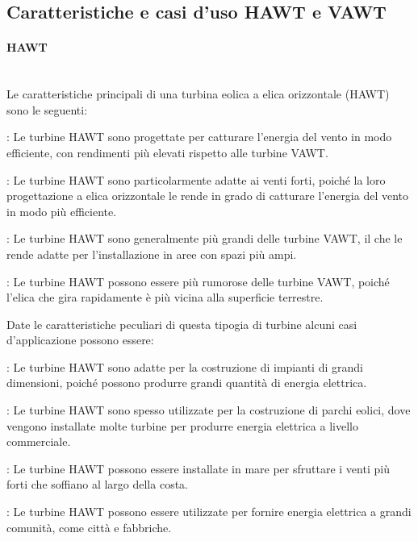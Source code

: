 \subsection{Caratteristiche e casi d'uso HAWT e VAWT}
\paragraph{HAWT}\mbox{}\\
Le caratteristiche principali di una turbina eolica a elica orizzontale (HAWT) sono le seguenti:
\begin{description}[labelindent=5mm]
    \item[$\bullet$ Alta efficienza]: Le turbine HAWT sono progettate per catturare l'energia del vento in modo efficiente, con rendimenti più elevati rispetto alle turbine VAWT.
    \item[$\bullet$ Adatte ai venti forti]: Le turbine HAWT sono particolarmente adatte ai venti forti, poiché la loro progettazione a elica orizzontale le rende in grado di catturare l'energia del vento in modo più efficiente.
    \item[$\bullet$ Dimensioni maggiori]: Le turbine HAWT sono generalmente più grandi delle turbine VAWT, il che le rende adatte per l'installazione in aree con spazi più ampi.
    \item[$\bullet$ Funzionamento più rumoroso]: Le turbine HAWT possono essere più rumorose delle turbine VAWT, poiché l'elica che gira rapidamente è più vicina alla superficie terrestre.
\end{description}
Date le caratteristiche peculiari di questa tipogia di turbine alcuni casi d'applicazione possono essere:
\begin{description}[labelindent=5mm]
    \item[$\bullet$ Impianti di grandi dimensioni]: Le turbine HAWT sono adatte per la costruzione di impianti di grandi dimensioni, poiché possono produrre grandi quantità di energia elettrica.
    \item[$\bullet$ Parchi eolici]: Le turbine HAWT sono spesso utilizzate per la costruzione di parchi eolici, dove vengono installate molte turbine per produrre energia elettrica a livello commerciale.
    \item[$\bullet$ Installazioni offshore]: Le turbine HAWT possono essere installate in mare per sfruttare i venti più forti che soffiano al largo della costa.
    \item[$\bullet$ Alimentazione elettrica per grandi comunità]: Le turbine HAWT possono essere utilizzate per fornire energia elettrica a grandi comunità, come città e fabbriche.
\end{description}
